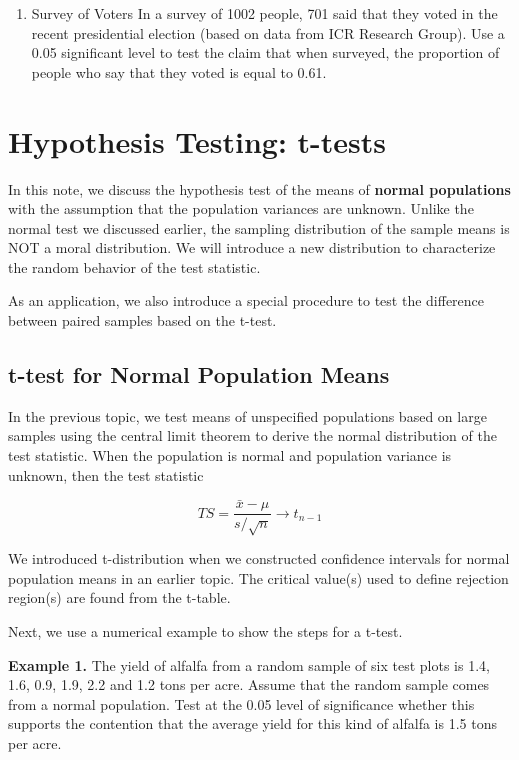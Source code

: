 \documentclass[
]{book}
\providecommand{\tightlist}{%
  \setlength{\itemsep}{0pt}\setlength{\parskip}{0pt}}
\begin{document}
\hfill\break

\begin{enumerate}
\def\labelenumi{\arabic{enumi}.}
\setcounter{enumi}{4}
\tightlist
\item
  Survey of Voters In a survey of 1002 people, 701 said that they voted in the recent presidential election (based on data from ICR Research Group). Use a 0.05 significant level to test the claim that when surveyed, the proportion of people who say that they voted is equal to 0.61.
\end{enumerate}

\hypertarget{hypothesis-testing-t-tests}{%
\chapter{Hypothesis Testing: t-tests}\label{hypothesis-testing-t-tests}}

In this note, we discuss the hypothesis test of the means of \textbf{normal populations} with the assumption that the population variances are unknown. Unlike the normal test we discussed earlier, the sampling distribution of the sample means is NOT a moral distribution. We will introduce a new distribution to characterize the random behavior of the test statistic.

As an application, we also introduce a special procedure to test the difference between paired samples based on the t-test.

\hypertarget{t-test-for-normal-population-means}{%
\section{t-test for Normal Population Means}\label{t-test-for-normal-population-means}}

In the previous topic, we test means of unspecified populations based on large samples using the central limit theorem to derive the normal distribution of the test statistic. When the population is normal and population variance is unknown, then the test statistic

\[
TS = \frac{\bar{x} - \mu}{s/\sqrt{n}} \to t_{n-1}
\]

We introduced t-distribution when we constructed confidence intervals for normal population means in an earlier topic. The critical value(s) used to define rejection region(s) are found from the t-table.

Next, we use a numerical example to show the steps for a t-test.

\textbf{Example 1.} The yield of alfalfa from a random sample of six test plots is 1.4, 1.6, 0.9, 1.9, 2.2 and 1.2 tons per acre. Assume that the random sample comes from a normal population. Test at the 0.05 level of significance whether this supports the contention that the average yield for this kind of alfalfa is 1.5 tons per acre.
\end{document}

